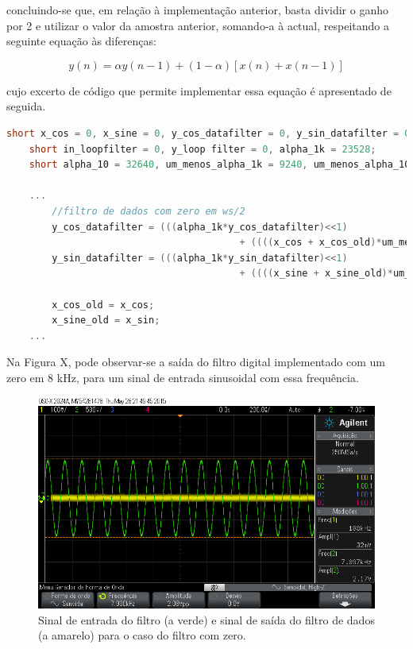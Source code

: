 \documentclass[11pt]{article}
\numberwithin{equation}{section}
\begin{document}
{\vspace{1mm}
concluindo-se que, em relação à implementação anterior, basta dividir o ganho por 2 e utilizar o valor da amostra anterior, somando-a à actual, respeitando a seguinte equação às diferenças:

\vspace{-3mm}
\begin{equation}
y(n) = \alpha y(n-1) +  (1-\alpha)[x(n) + x(n-1)]
\end{equation} 

\vspace{1mm}
cujo excerto de código que permite implementar essa equação é apresentado de seguida.

\begin{lstlisting}[language=C]
	short x_cos = 0, x_sine = 0, y_cos_datafilter = 0, y_sin_datafilter = 0;  
	short in_loopfilter = 0, y_loop filter = 0, alpha_1k = 23528; 
	short alpha_10 = 32640, um_menos_alpha_1k = 9240, um_menos_alpha_10 = 127;
	
	...
		//filtro de dados com zero em ws/2
		y_cos_datafilter = (((alpha_1k*y_cos_datafilter)<<1) 
										 + ((((x_cos + x_cos_old)*um_menos_alpha_1k)>>1)<<1))>>16;
		y_sin_datafilter = (((alpha_1k*y_sin_datafilter)<<1) 
										 + ((((x_sine + x_sine_old)*um_menos_alpha_1k)>>1)<<1))>>16;

		x_cos_old = x_cos;
		x_sine_old = x_sin;
	...
\end{lstlisting}

Na Figura X, pode observar-se a saída do filtro digital implementado com um zero em 8 kHz, para um sinal de entrada sinusoidal com essa frequência. 

\begin{figure}[H]
	\centering
	\includegraphics[keepaspectratio=true, scale=0.37]{exps/FiltroComZero8k}
	\caption{Sinal de entrada do filtro (a verde) e sinal de saída do filtro de dados (a amarelo) para o caso do filtro com zero.}
	\vspace{-0.8em}
\end{figure} 

}
\end{document}
